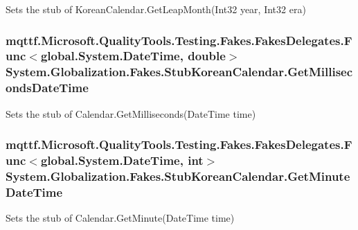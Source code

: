 Sets the stub of Korean\-Calendar.\-Get\-Leap\-Month(\-Int32 year, Int32 era)

\hypertarget{class_system_1_1_globalization_1_1_fakes_1_1_stub_korean_calendar_abd8ba69c37df104c08fa0d15a32cbdc8}{
\subsubsection[{Get\-Milliseconds\-Date\-Time}]{\setlength{\rightskip}{0pt plus 5cm}mqttf.\-Microsoft.\-Quality\-Tools.\-Testing.\-Fakes.\-Fakes\-Delegates.\-Func$<$global.\-System.\-Date\-Time, double$>$ System.\-Globalization.\-Fakes.\-Stub\-Korean\-Calendar.\-Get\-Milliseconds\-Date\-Time}}\label{class_system_1_1_globalization_1_1_fakes_1_1_stub_korean_calendar_abd8ba69c37df104c08fa0d15a32cbdc8}


Sets the stub of Calendar.\-Get\-Milliseconds(\-Date\-Time time)

\hypertarget{class_system_1_1_globalization_1_1_fakes_1_1_stub_korean_calendar_a38ffce7d8e73044307fcde26eace1038}{
\subsubsection[{Get\-Minute\-Date\-Time}]{\setlength{\rightskip}{0pt plus 5cm}mqttf.\-Microsoft.\-Quality\-Tools.\-Testing.\-Fakes.\-Fakes\-Delegates.\-Func$<$global.\-System.\-Date\-Time, int$>$ System.\-Globalization.\-Fakes.\-Stub\-Korean\-Calendar.\-Get\-Minute\-Date\-Time}}\label{class_system_1_1_globalization_1_1_fakes_1_1_stub_korean_calendar_a38ffce7d8e73044307fcde26eace1038}


Sets the stub of Calendar.\-Get\-Minute(\-Date\-Time time)

